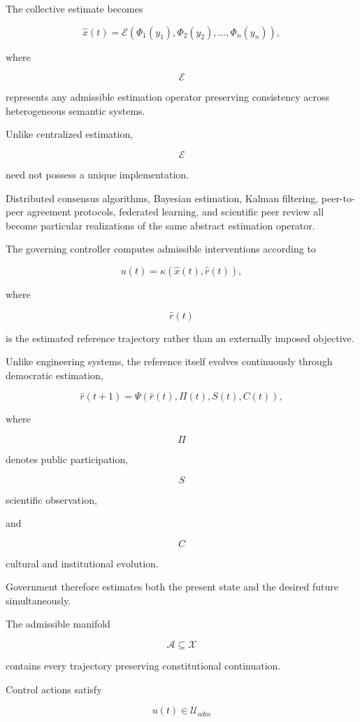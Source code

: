 \documentclass[12pt,a4paper]{article}
\begin{document}
The collective estimate becomes

\[
\hat{x}(t)
=
\mathcal{E}
\left(
\Phi_1(y_1),
\Phi_2(y_2),
\dots,
\Phi_n(y_n)
\right),
\]

where

\[
\mathcal{E}
\]

represents any admissible estimation operator preserving consistency across heterogeneous semantic systems.

Unlike centralized estimation,

\[
\mathcal{E}
\]

need not possess a unique implementation.

Distributed consensus algorithms, Bayesian estimation, Kalman filtering, peer-to-peer agreement protocols, federated learning, and scientific peer review all become particular realizations of the same abstract estimation operator.

The governing controller computes admissible interventions according to

\[
u(t)
=
\kappa
\left(
\hat{x}(t),
\hat{r}(t)
\right),
\]

where

\[
\hat{r}(t)
\]

is the estimated reference trajectory rather than an externally imposed objective.

Unlike engineering systems, the reference itself evolves continuously through democratic estimation,

\[
\hat{r}(t+1)
=
\Psi
\left(
\hat{r}(t),
\Pi(t),
S(t),
C(t)
\right),
\]

where

\[
\Pi
\]

denotes public participation,

\[
S
\]

scientific observation,

and

\[
C
\]

cultural and institutional evolution.

Government therefore estimates both the present state and the desired future simultaneously.

The admissible manifold

\[
\mathcal{A}
\subseteq
\mathcal{X}
\]

contains every trajectory preserving constitutional continuation.

Control actions satisfy

\[
u(t)
\in
\mathcal{U}_{adm}
\]
\end{document}

